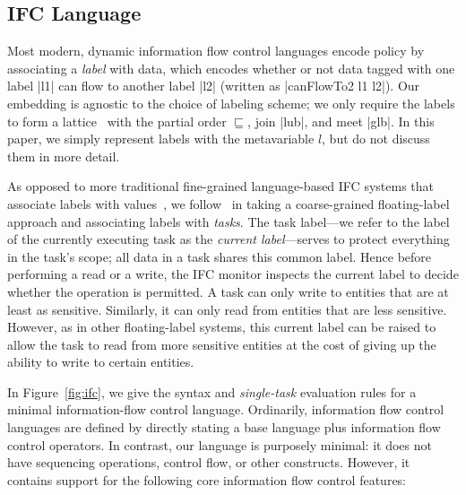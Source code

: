 \subsection{IFC Language}

Most modern, dynamic information flow control languages encode
policy by associating a \emph{label}
with data, which encodes whether or not data tagged with one
label |l1| can flow to another label |l2| (written as |canFlowTo2 l1 l2|).
Our embedding is agnostic to the choice of labeling scheme; we only
require the labels to form a lattice~\cite{Denning:1976:LMS:360051.360056}
with the partial order $\sqsubseteq$, join |lub|, and meet |glb|.
In this paper, we simply represent labels with the metavariable
$l$, but do not discuss them in more detail.

As opposed to more traditional fine-grained language-based IFC systems that
associate labels with values~\cite{sabelfeld2003language,
Austin:Flanagan:PLAS09}, we follow~\cite{Zeldovich:2006, lio} in taking a
coarse-grained floating-label approach and associating labels with
\emph{tasks}.
%
The task label---we refer to the label of the currently executing task as the
\emph{current label}---serves to protect everything in the task's scope;
all data in a task shares this common label.
%
Hence before performing a read or a write, the IFC monitor inspects the
current label to decide whether the operation is permitted.
%
A task can only write to entities that are at least as sensitive.
%
Similarly, it can only read from entities that are less sensitive.
%
However, as in other floating-label systems, this current label can be raised
to allow the task to read from more sensitive entities at the cost of giving up
the ability to write to certain entities.

In Figure~\ref{fig:ifc}, we give the syntax and \emph{single-task}
evaluation rules for a minimal information-flow control language.  
Ordinarily, information flow control languages are defined by directly
stating a base language plus information flow control operators.  In
contrast, our language is purposely minimal: it does not have sequencing
operations, control flow, or other constructs.  However, it contains
support for the following core information flow control features:

